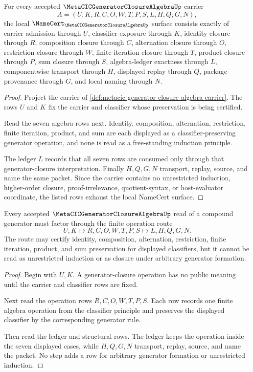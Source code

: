 \begin{theorem}
\label{thm:metacic-generator-closure-algebra-namecert-obligations}
For every accepted $\MetaCICGeneratorClosureAlgebraUp$ carrier
$$
A=(U,K,R,C,O,W,T,P,S,L,H,Q,G,N),
$$
the local $\NameCert_{\MetaCICGeneratorClosureAlgebraUp}$ surface consists exactly of carrier admission through $U$, classifier exposure through $K$, identity closure through $R$, composition closure through $C$, alternation closure through $O$, restriction closure through $W$, finite-iteration closure through $T$, product closure through $P$, sum closure through $S$, algebra-ledger exactness through $L$, componentwise transport through $H$, displayed replay through $Q$, package provenance through $G$, and local naming through $N$.
\end{theorem}
\begin{proof}
Project the carrier of \autoref{def:metacic-generator-closure-algebra-carrier}. The rows $U$ and $K$ fix the carrier and classifier whose preservation is being certified.

Read the seven algebra rows next. Identity, composition, alternation, restriction, finite iteration, product, and sum are each displayed as a classifier-preserving generator operation, and none is read as a free-standing induction principle.

The ledger $L$ records that all seven rows are consumed only through that generator-closure interpretation. Finally $H,Q,G,N$ transport, replay, source, and name the same packet. Since the carrier contains no unrestricted induction, higher-order closure, proof-irrelevance, quotient-syntax, or host-evaluator coordinate, the listed rows exhaust the local NameCert surface.
\end{proof}

\begin{theorem}
\label{thm:metacic-generator-closure-algebra-operation-readback}
Every accepted $\MetaCICGeneratorClosureAlgebraUp$ read of a compound generator must factor through the finite operation route
$$
U,K \longmapsto R,C,O,W,T,P,S \longmapsto L,H,Q,G,N .
$$
The route may certify identity, composition, alternation, restriction, finite iteration, product, and sum preservation for displayed classifiers, but it cannot be read as unrestricted induction or as closure under arbitrary generator formation.
\end{theorem}
\begin{proof}
Begin with $U,K$. A generator-closure operation has no public meaning until the carrier and classifier rows are fixed.

Next read the operation rows $R,C,O,W,T,P,S$. Each row records one finite algebra operation from the classifier principle and preserves the displayed classifier by the corresponding generator rule.

Then read the ledger and structural rows. The ledger keeps the operation inside the seven displayed cases, while $H,Q,G,N$ transport, replay, source, and name the packet. No step adds a row for arbitrary generator formation or unrestricted induction.
\end{proof}

